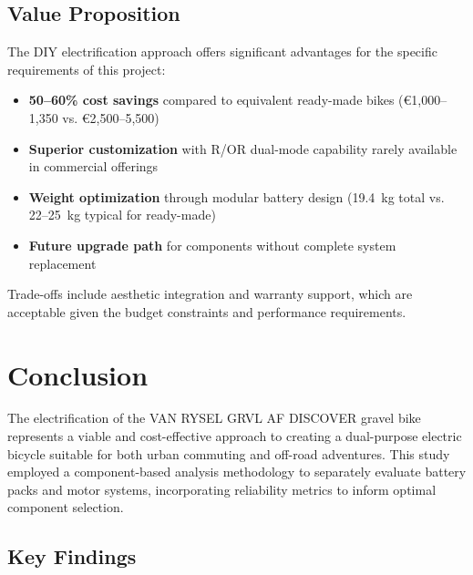\documentclass[12pt,a4paper]{article}
\begin{document}
\subsection{Value Proposition}

The DIY electrification approach offers significant advantages for the specific requirements of this project:
\begin{itemize}
    \item \textbf{50--60\% cost savings} compared to equivalent ready-made bikes (€1,000--1,350 vs. €2,500--5,500)
    \item \textbf{Superior customization} with R/OR dual-mode capability rarely available in commercial offerings
    \item \textbf{Weight optimization} through modular battery design (19.4~kg total vs. 22--25~kg typical for ready-made)
    \item \textbf{Future upgrade path} for components without complete system replacement
\end{itemize}

Trade-offs include aesthetic integration and warranty support, which are acceptable given the budget constraints and performance requirements.

\section{Conclusion}

The electrification of the VAN RYSEL GRVL AF DISCOVER gravel bike represents a viable and cost-effective approach to creating a dual-purpose electric bicycle suitable for both urban commuting and off-road adventures. This study employed a component-based analysis methodology to separately evaluate battery packs and motor systems, incorporating reliability metrics to inform optimal component selection.

\subsection{Key Findings}
\end{document}
